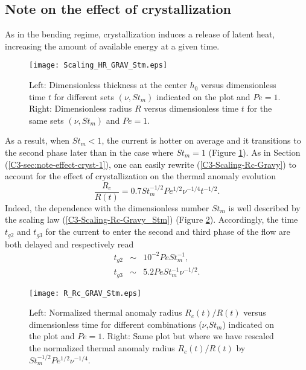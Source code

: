 \subsection{Note on the effect of crystallization}
\label{C3-sec:note-effect-cryst-2}

As in the bending regime,  crystallization induces a release of latent
heat, increasing the amount of available energy at a given time.
\begin{figure}[h!]
  \begin{center}
    \graphicspath{ {/Users/thorey/Documents/These/Projet/Refroidissement/Skin_Model/Figure/JFM_V13/} }
    \texttt{[image: Scaling\_HR\_GRAV\_Stm.eps]}
    \caption{Left: Dimensionless thickness at  the center $h_0$ versus
      dimensionless time $t$ for different sets $(\nu,St_m)$ indicated
      on the plot  and $Pe=1$. Right: Dimensionless  radius $R$ versus
      dimensionless  time  $t$  for  the same  sets  $(\nu,St_m)$  and
      $Pe=1$.}
    \label{C3-Scaling_HR_GRAV_Stm}
  \end{center}
\end{figure}
As a  result, when $St_m<1$, the  current is hotter on  average and it
transitions to the second phase later  than in the case where $St_m=1$
(Figure     \ref{C3-Scaling_HR_GRAV_Stm}).       As     in     Section
(\ref{C3-sec:note-effect-cryst-1}),    one    can    easily    rewrite
(\ref{C3-Scaling-Rc-Gravy})   to    account   for   the    effect   of
crystallization on the thermal anomaly evolution
\begin{equation}
  \frac{R_c}{R(t)} = 0.7 St_m^{-1/2}Pe^{1/2}\nu^{-1/4}t^{-1/2}.
  \label{C3-Scaling-Rc-Gravy_Stm}
\end{equation}
Indeed, the  dependence with the  dimensionless number $St_m$  is well
described by  the scaling law  (\ref{C3-Scaling-Rc-Gravy_Stm}) (Figure
\ref{C3-R_Rc_GRAV_Stm}).  Accordingly, the  time $t_{g2}$ and $t_{g3}$
for the current  to enter the second  and third phase of  the flow are
both delayed and respectively read
\begin{eqnarray}
  t_{g2}&\sim&10^{-2}PeSt_m^{-1}\label{C3-tg2},\\
  t_{g3}&\sim& 5.2Pe St_m^{-1}\nu^{-1/2}\label{C3-tg3}.
\end{eqnarray}

\begin{figure}[h!]
  \begin{center}
    \graphicspath{ {/Users/thorey/Documents/These/Projet/Refroidissement/Skin_Model/Figure/JFM_V13/} }
    \texttt{[image: R\_Rc\_GRAV\_Stm.eps]}
    \caption{Left:  Normalized  thermal anomaly  radius  $R_c(t)/R(t)$
      versus   dimensionless    time   for    different   combinations
      ($\nu$,$St_m$) indicated  on the  plot and $Pe=1$.   Right: Same
      plot but where  we have rescaled the  normalized thermal anomaly
      radius $R_c(t)/R(t)$ by $St_m^{-1/2}Pe^{1/2}\nu^{-1/4}$.}
    \label{C3-R_Rc_GRAV_Stm}
  \end{center}
\end{figure}

